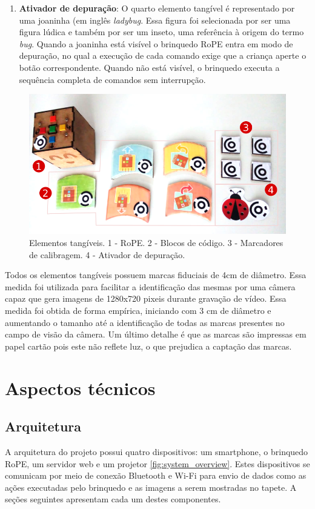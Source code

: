 \begin{enumerate}
\item \textbf{Ativador de depuração}: O quarto elemento tangível é representado por uma joaninha (em inglês \textit{ladybug}. Essa figura foi selecionada por ser uma figura lúdica e também por ser um inseto, uma referência à origem do termo \textit{bug}. Quando a joaninha está visível o brinquedo RoPE entra em modo de depuração, no qual a execução de cada comando exige que a criança aperte o botão correspondente. Quando não está visível, o brinquedo executa a sequência completa de comandos sem interrupção.
\end{enumerate}

\begin{figure}
\centering
        \includegraphics[width=.9\linewidth,fbox]{figs/tangible_elements.png}
        \caption{Elementos tangíveis. 1 - RoPE. 2 - Blocos de código. 3 - Marcadores de calibragem. 4 - Ativador de depuração.}
        \label{fig:tangible_elements}
\end{figure}
Todos os elementos tangíveis possuem marcas fiduciais de 4cm de diâmetro. Essa medida foi utilizada para facilitar a identificação das mesmas por uma câmera capaz que gera imagens de 1280x720 pixeis durante gravação de vídeo. Essa medida foi obtida de forma empírica, iniciando com 3 cm de diâmetro e aumentando o tamanho até a identificação de todas as marcas presentes no campo de visão da câmera. Um último detalhe é que as marcas são impressas em papel cartão pois este não reflete luz, o que prejudica a captação das marcas.

\section{Aspectos técnicos}
\label{sec:detalhes_tecnicos}
\subsection{Arquitetura}
A arquitetura do projeto possui quatro dispositivos: um smartphone, o brinquedo RoPE, um servidor web e um projetor \autoref{fig:system_overview}. Estes dispositivos se comunicam por meio de conexão Bluetooth e Wi-Fi para envio de dados como as ações executadas pelo brinquedo e as imagens a serem mostradas no tapete.  A seções seguintes apresentam cada um destes componentes.

